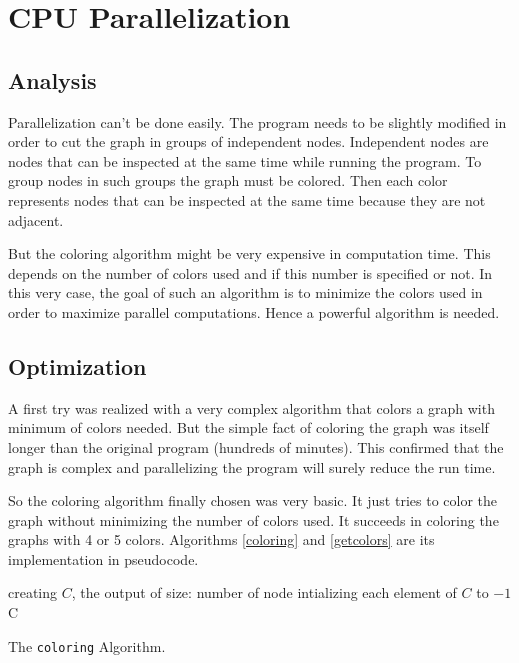 \documentclass[fleqn,11pt]{SelfArx} %
\theoremstyle{definition}
\begin{document}

\section{CPU Parallelization}

\subsection{Analysis}

Parallelization can't be done easily. The program needs to be slightly modified in order to cut the graph in groups of independent nodes. Independent nodes are nodes that can be inspected at the same time while running the program. To group nodes in such groups the graph must be colored. Then each color represents nodes that can be inspected at the same time because they are not adjacent.

But the coloring algorithm might be very expensive in computation time. This depends on the number of colors used and if this number is specified or not. In this very case, the goal of such an algorithm is to minimize the colors used in order to maximize parallel computations. Hence a powerful algorithm is needed.

\subsection{Optimization}

A first try was realized with a very complex algorithm that colors a graph with minimum of colors needed. But the simple fact of coloring the graph was itself longer than the original program (hundreds of minutes). This confirmed that the graph is complex and parallelizing the program will surely reduce the run time.

So the coloring algorithm finally chosen was very basic. It just tries to color the graph without minimizing the number of colors used. It succeeds in coloring the graphs with 4 or 5 colors. Algorithms \ref{coloring} and \ref{getcolors} are its implementation in pseudocode.

\begin{algorithm}[h]

\BlankLine

creating $C$, the output of size: number of node\;
intializing each element of $C$ to $-1$\;
\Return C\;

\caption{The \texttt{coloring} Algorithm.}
\label{coloring}
\end{algorithm}
\end{document}
